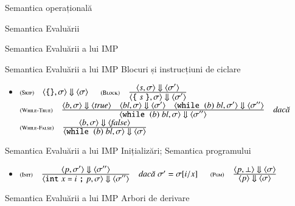 \documentclass[xcolor=pdftex,romanian,colorlinks]{beamer}
\begin{document}
\begin{section}{Semantica operațională}
\begin{subsection}{Semantica Evaluării}
\begin{frame}{Semantica Evaluării a lui IMP}
\begin{itemize}
\end{itemize}
\end{frame}
\begin{frame}{Semantica Evaluării a lui IMP}
{Blocuri și instrucțiuni de ciclare}
\begin{itemize}
\item[] $\reg[Skip]{\S{\c{\terminal{\{\}},\sigma}}{\c{\sigma}}}{}{}$
\vitem[] $\reg[Block]{\S{\c{\terminal{\{}s\terminal{\}},\sigma}}{\c{\sigma'}}}{\S{\c{s,\sigma}}{\c{\sigma'}}}{}$
\vitem[] $\reg[While-True]{\S{\c{\Swhile\;(b)\;{\it bl},\sigma}}{\c{\sigma''}}}{\S{\c{b,\sigma}}{\c{\Strue}}\si \S{\c{{\it bl},\sigma}}{\c{\sigma'}} \si \S{\c{\Swhile\;(b)\;{\it bl},\sigma'}}{\c{\sigma''}}}{\hspace{-2.5em}}$
\vitem[] $\reg[While-False]{\S{\c{\Swhile\;(b)\;{\it bl},\sigma}}{\c{\sigma}}}{\S{\c{b,\sigma}}{\c{\Sfalse}}}{}$
\end{itemize}
\end{frame}
\begin{frame}{Semantica Evaluării a lui IMP}
{Inițializări; Semantica programului}
\begin{itemize}
\item[] $\reg[Init]{\S{\c{\Sint x \terminal{=} i \terminal{;} p, \sigma}}{\c{\sigma''}}}{\S{\c{p,\sigma'}}{\c{\sigma''}}}{\sigma' = \sigma[i/x]}$
\vitem[] $\reg[Pgm]{\S{\c{p}}{\c{\sigma}}}{\S{\c{p,\bottom}}{\c{\sigma}}}{}$
\end{itemize}
\end{frame}
\begin{frame}{Semantica Evaluării a lui IMP}
{Arbori de derivare}


\end{frame}
\end{subsection}
\end{section}
\end{document}
